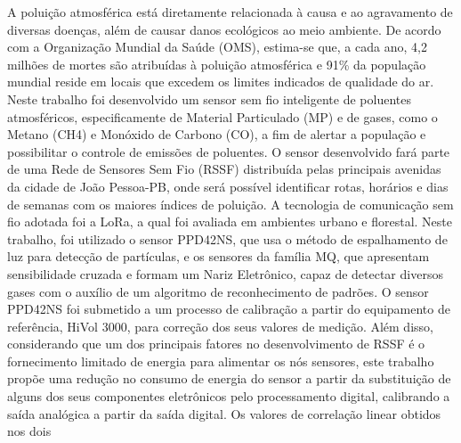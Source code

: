 \documentclass[12pt,a4paper]{article}
\begin{document}
                                     {A poluição atmosférica está diretamente relacionada à causa e ao agravamento de diversas 
                                      doenças, além de causar danos ecológicos ao meio ambiente. 
                                      De acordo com a Organização Mundial da Saúde (OMS), estima-se que, a cada ano, 4,2 milhões de 
                                      mortes são atribuídas à poluição atmosférica e 91\% da população mundial reside em locais que excedem os 
                                      limites indicados de qualidade do ar. Neste trabalho foi desenvolvido um sensor sem fio inteligente de 
                                      poluentes atmosféricos, especificamente de Material Particulado (MP) e de gases, como o Metano (CH4) e 
                                      Monóxido de Carbono (CO), a fim de alertar a população e possibilitar o controle de emissões de poluentes. 
                                      O sensor desenvolvido fará parte de uma Rede de Sensores Sem Fio (RSSF) distribuída pelas principais 
                                      avenidas da cidade de João Pessoa-PB, onde será possível identificar rotas, horários e dias de semanas com 
                                      os maiores índices de poluição. A tecnologia de comunicação sem fio adotada foi a LoRa, a qual foi avaliada 
                                      em ambientes urbano e florestal. Neste trabalho, foi utilizado o sensor PPD42NS, que usa o método de 
                                      espalhamento de luz para detecção de partículas, e os sensores da família MQ, que apresentam sensibilidade 
                                      cruzada e formam um Nariz Eletrônico, capaz de detectar diversos gases com o auxílio de um algoritmo de 
                                      reconhecimento de padrões. O sensor PPD42NS foi submetido a um processo de calibração a partir do 
                                      equipamento de referência, HiVol 3000, para correção dos seus valores de medição. Além disso, 
                                      considerando que um dos principais fatores no desenvolvimento de RSSF é o fornecimento limitado 
                                      de energia para alimentar os nós sensores, este trabalho propõe uma redução no consumo de energia do 
                                      sensor a partir da substituição de alguns dos seus componentes eletrônicos pelo processamento digital, 
                                      calibrando a saída analógica a partir da saída digital. Os valores de correlação linear obtidos nos dois 
}
\end{document}
